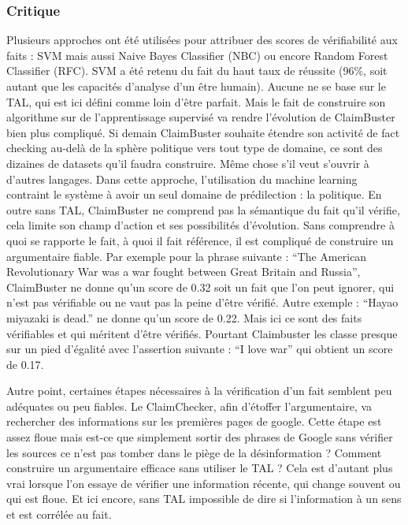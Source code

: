 \subsubsection{Critique}

Plusieurs approches ont été utilisées pour attribuer des scores de vérifiabilité aux faits : SVM mais aussi Naive Bayes Classifier (NBC) ou encore Random Forest Classifier (RFC). SVM a été retenu du fait du haut taux de réussite (96\%, soit autant que les capacités d'analyse d'un être humain). Aucune ne se base sur le TAL, qui est ici défini comme loin d'être parfait. Mais le fait de construire son algorithme sur de l'apprentissage supervisé va rendre l'évolution de ClaimBuster bien plus compliqué. Si demain ClaimBuster souhaite étendre son activité de fact checking au-delà de la sphère politique vers tout type de domaine, ce sont des dizaines de datasets qu'il faudra construire. Même chose s'il veut s'ouvrir à d'autres langages. Dans cette approche, l'utilisation du machine learning contraint le système à avoir un seul domaine de prédilection : la politique. En outre sans TAL, ClaimBuster ne comprend pas la sémantique du fait qu'il vérifie, cela limite son champ d'action et ses possibilités d'évolution. Sans comprendre à quoi se rapporte le fait, à quoi il fait référence, il est compliqué de construire un argumentaire fiable. Par exemple pour la phrase suivante : \enquote{The American Revolutionary War was a war fought between Great Britain and Russia}, ClaimBuster ne donne qu'un score de 0.32 soit un fait que l'on peut ignorer, qui n'est pas vérifiable ou ne vaut pas la peine d'être vérifié. Autre exemple : \enquote{Hayao miyazaki is dead.} ne donne qu'un score de 0.22. Mais ici ce sont des faits vérifiables et qui méritent d'être vérifiés. Pourtant Claimbuster les classe presque sur un pied d'égalité avec l'assertion suivante : \enquote{I love war} qui obtient un score de 0.17. 

Autre point, certaines étapes nécessaires à la vérification d'un fait semblent peu adéquates ou peu fiables. Le ClaimChecker, afin d'étoffer l'argumentaire, va rechercher des informations sur les premières pages de google. Cette étape est assez floue mais est-ce que simplement sortir des phrases de Google sans vérifier les sources ce n'est pas tomber dans le piège de la désinformation ? Comment construire un argumentaire efficace sans utiliser le TAL ? Cela est d'autant plus vrai lorsque l'on essaye de vérifier une information récente, qui change souvent ou qui est floue. Et ici encore, sans TAL impossible de dire si l'information à un sens et est corrélée au fait.

